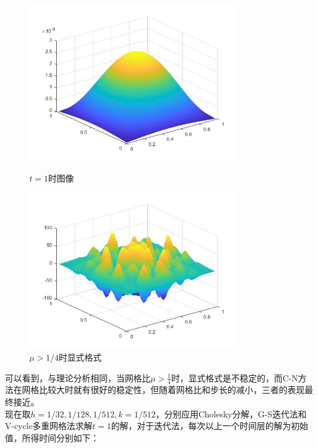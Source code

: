 \documentclass[12pt]{ctexart}
\begin{document}
\begin{figure}[H]
	\centering
	\begin{minipage}[t]{0.48\textwidth}
		\centering
		\includegraphics[width=9cm]{热扩散.jpg}
		\caption{$t=1$时图像}
	\end{minipage}
	\begin{minipage}[t]{0.48\textwidth}
		\centering
		\includegraphics[width=9cm]{显式不稳定.jpg}
		\caption{$\mu>1/4$时显式格式}
	\end{minipage}
\end{figure}

\noindent 可以看到，与理论分析相同，当网格比$\mu > \frac{1}{4}$时，显式格式是不稳定的，而C-N方法在网格比较大时就有很好的稳定性，但随着网格比和步长的减小，三者的表现最终接近。\\
\indent 现在取$h = 1/32,1/128,1/512,k = 1/512$，分别应用Cholesky分解，G-S迭代法和V-cycle多重网格法求解$t=1$的解，对于迭代法，每次以上一个时间层的解为初始值，所得时间分别如下：\\
\end{document}
